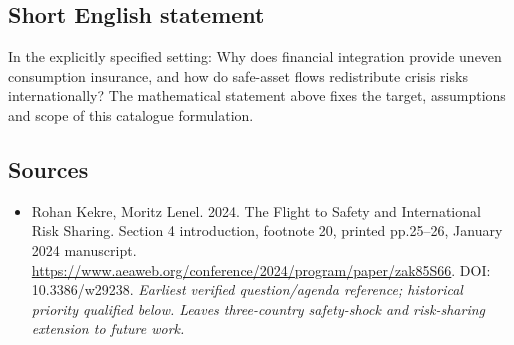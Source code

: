 \documentclass[11pt]{article}
\begin{document}
\subsection{Short English statement}
In the explicitly specified setting: Why does financial integration provide uneven consumption insurance, and how do safe-asset flows redistribute crisis risks internationally? The mathematical statement above fixes the target, assumptions and scope of this catalogue formulation.

\subsection{Sources}
\begin{itemize}\raggedright
\item[\textnormal{[S1]}]\hypertarget{source:30007617:1}{} Rohan Kekre, Moritz Lenel. 2024. The Flight to Safety and International Risk Sharing. Section 4 introduction, footnote 20, printed pp.25–26, January 2024 manuscript.
\url{https://www.aeaweb.org/conference/2024/program/paper/zak85S66}.
DOI: 10.3386/w29238.
{\small\textit{Earliest verified question/agenda reference; historical priority qualified below. Leaves three-country safety-shock and risk-sharing extension to future work.}}
\end{itemize}
\end{document}

